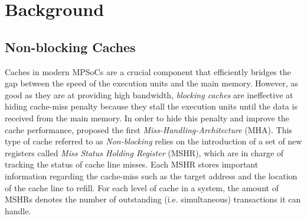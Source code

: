 \section{Background}
    \subsection{Non-blocking Caches}
%

        Caches in modern MPSoCs are a crucial component that efficiently bridges the gap between the speed of the execution units and the main memory.
        However, as good as they are at providing high bandwidth, \emph{blocking caches} are ineffective at hiding cache-miss penalty because they stall the execution units until the data is received from the main memory.
        In order to hide this penalty and improve the cache performance, \cite{Kroft} proposed the first \emph{Miss-Handling-Architecture} (MHA).
        This type of cache referred to as \emph{Non-blocking} relies on the introduction of a set of new registers called \emph{Miss Status Holding Register} (MSHR), which are in charge of tracking the status of cache line misses.
        Each MSHR stores important information regarding the cache-miss such as the target address and the location of the cache line to refill.
        For each level of cache in a system, the amount of MSHRs denotes the number of outstanding (i.e. simultaneous) transactions it can handle.

